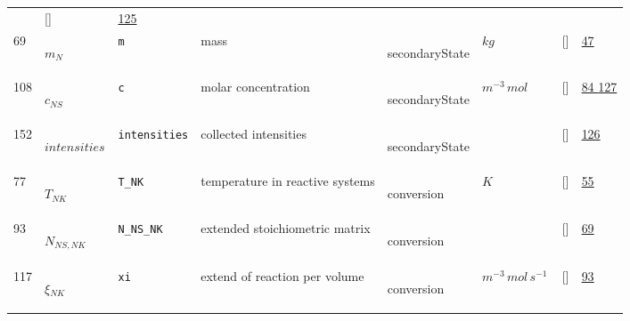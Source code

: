 \begin{longtable}{|p{1cm}|p{3cm}|p{3cm}|p{7cm}|p{3.0cm}|p{3cm}|p{2cm}|p{1cm}|}
             & []
             & \hyperlink{"e:125"}{ 125 }
                 \\
    69
             & \hypertarget{"v:69"}{ $ {m}{_{N}} $}
             & \verb|m|
             & mass
             & \begin{lay}secondaryState \end{lay}
             & $ kg \, $
             & []
             & \hyperlink{"e:47"}{ 47 }
                 \\
    108
             & \hypertarget{"v:108"}{ $ {c}{_{{N S}}} $}
             & \verb|c|
             & molar concentration
             & \begin{lay}secondaryState \end{lay}
             & $ m^{-3} \,mol \, $
             & []
             & \hyperlink{"e:84"}{ 84 }
                 \hyperlink{"e:127"}{ 127 }
                 \\
    152
             & \hypertarget{"v:152"}{ $ {intensities}{_{}} $}
             & \verb|intensities|
             & collected intensities
             & \begin{lay}secondaryState \end{lay}
             & $  $
             & []
             & \hyperlink{"e:126"}{ 126 }
                 \\
    77
             & \hypertarget{"v:77"}{ $ {T}{_{{N K}}} $}
             & \verb|T_NK|
             & temperature in reactive systems
             & \begin{lay}conversion \end{lay}
             & $ K \, $
             & []
             & \hyperlink{"e:55"}{ 55 }
                 \\
    93
             & \hypertarget{"v:93"}{ $ {N}{_{{N S}, {N K}}} $}
             & \verb|N_NS_NK|
             & extended stoichiometric matrix
             & \begin{lay}conversion \end{lay}
             & $  $
             & []
             & \hyperlink{"e:69"}{ 69 }
                 \\
    117
             & \hypertarget{"v:117"}{ $ {\xi}{_{{N K}}} $}
             & \verb|xi|
             & extend of reaction per volume
             & \begin{lay}conversion \end{lay}
             & $ m^{-3} \,mol \,s^{-1} \, $
             & []
             & \hyperlink{"e:93"}{ 93 }
                 \\

\end{longtable}
